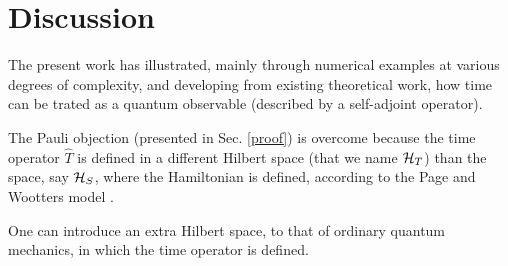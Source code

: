\section{Discussion}

The present work has illustrated,
mainly through numerical examples
at various degrees of complexity,
and developing from existing theoretical work,
how time can be trated as a quantum observable
(described by a self-adjoint operator).

The Pauli objection (presented in Sec. \ref{proof})
is overcome because the time operator $\hat{T}$
is defined in a different Hilbert space (that we name $\mathcal{H}_T$)
than the space, say $\mathcal{H}_S$, where the Hamiltonian is defined,
according to the Page and Wootters model
\parencite{PageWootters, Lloyd:Time, Marletto:Evolution, Maccone:QMOT, Maccone:Pauli}.

One can introduce an extra Hilbert space, to that of ordinary quantum mechanics,
in which the time operator is defined.